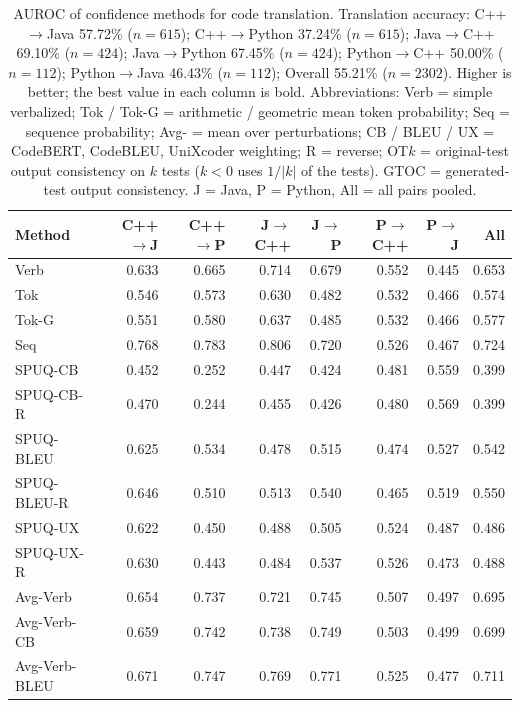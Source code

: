 {\scriptsize
\setlength{\tabcolsep}{2.5pt}
\renewcommand{\arraystretch}{0.95}
\begin{table}[t]
\centering
\caption{AUROC of confidence methods for code translation. Translation accuracy: C++$\rightarrow$Java 57.72\% ($n=615$); C++$\rightarrow$Python 37.24\% ($n=615$); Java$\rightarrow$C++ 69.10\% ($n=424$); Java$\rightarrow$Python 67.45\% ($n=424$); Python$\rightarrow$C++ 50.00\% ($n=112$); Python$\rightarrow$Java 46.43\% ($n=112$); Overall 55.21\% ($n=2302$). Higher is better; the best value in each column is bold. Abbreviations: Verb = simple verbalized; Tok / Tok-G = arithmetic / geometric mean token probability; Seq = sequence probability; Avg- = mean over perturbations; CB / BLEU / UX = CodeBERT, CodeBLEU, UniXcoder weighting; R = reverse; OT$k$ = original-test output consistency on $k$ tests ($k<0$ uses $1/|k|$ of the tests). GTOC = generated-test output consistency. J = Java, P = Python, All = all pairs pooled.}
\label{tab:translation-auroc}
\begin{tabular}{@{}lrrrrrrr@{}}
\toprule
Method & C++$\to$J & C++$\to$P & J$\to$C++ & J$\to$P & P$\to$C++ & P$\to$J & All \\
\midrule
Verb & 0.633 & 0.665 & 0.714 & 0.679 & 0.552 & 0.445 & 0.653 \\
\addlinespace
Tok & 0.546 & 0.573 & 0.630 & 0.482 & 0.532 & 0.466 & 0.574 \\
Tok-G & 0.551 & 0.580 & 0.637 & 0.485 & 0.532 & 0.466 & 0.577 \\
\addlinespace
Seq & 0.768 & 0.783 & 0.806 & 0.720 & 0.526 & 0.467 & 0.724 \\
\addlinespace
SPUQ-CB & 0.452 & 0.252 & 0.447 & 0.424 & 0.481 & 0.559 & 0.399 \\
SPUQ-CB-R & 0.470 & 0.244 & 0.455 & 0.426 & 0.480 & 0.569 & 0.399 \\
SPUQ-BLEU & 0.625 & 0.534 & 0.478 & 0.515 & 0.474 & 0.527 & 0.542 \\
SPUQ-BLEU-R & 0.646 & 0.510 & 0.513 & 0.540 & 0.465 & 0.519 & 0.550 \\
SPUQ-UX & 0.622 & 0.450 & 0.488 & 0.505 & 0.524 & 0.487 & 0.486 \\
SPUQ-UX-R & 0.630 & 0.443 & 0.484 & 0.537 & 0.526 & 0.473 & 0.488 \\
\addlinespace
Avg-Verb & 0.654 & 0.737 & 0.721 & 0.745 & 0.507 & 0.497 & 0.695 \\
Avg-Verb-CB & 0.659 & 0.742 & 0.738 & 0.749 & 0.503 & 0.499 & 0.699 \\
Avg-Verb-BLEU & 0.671 & 0.747 & 0.769 & 0.771 & 0.525 & 0.477 & 0.711 \\

\end{tabular}
\end{table}}

